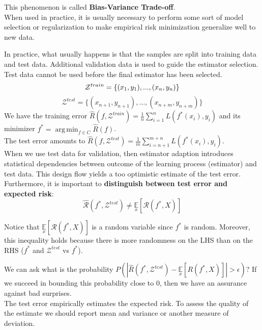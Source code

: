 \documentclass[twoside]{article}
\DeclareMathOperator*{\argmin}{arg\,min}
\begin{document}
This phenomenon is called \textbf{Bias-Variance Trade-off}.\\
When used in practice, it is usually necessary to perform some sort of model selection or regularization to make empirical risk minimization generalize well to new data.\medskip

In practice, what usually happens is that the samples are split into training data and test data. Additional validation data is used to guide the estimator selection.\\
Test data cannot be used before the final estimator has been selected.
\begin{equation*}
    \mathcal{Z}^{train} = \{(x_1, y_1),...,(x_n, y_n)\}\\
\end{equation*}
\begin{equation*}
    \mathcal{Z}^{test} = \{(x_{n+1}, y_{n+1}),...,(x_{n+m}, y_{n+m})\}
\end{equation*}
We have the training error $\hat{R}(f, \mathcal{Z}^{train}) = \frac{1}{n}\sum\limits_{i = 1}^{n}L(f^*(x_i), y_i)$ and its minimizer $f^* = \argmin_{f \in C} \hat{R}(f)$.\\
The test error amounts to $\hat{R}(f, \mathcal{Z}^{test}) = \frac{1}{m}\sum\limits_{i = n+1}^{m+n}L(f^*(x_i), y_i)$.\\
When we use test data for validation, then estimator adaption introduces statistical dependencies between outcome of the learning process (estimator) and test data. This design flow yields a too optimistic estimate of the test error.\\
Furthermore, it is important to \textbf{distinguish between test error and expected risk}:
\begin{equation*}
    \hat{\mathcal{R}}(f^*, \mathcal{Z}^{test}) \neq \underset{x}{\mathbb{E}}[\mathcal{R}(f^*, X)]
\end{equation*}

Notice that $\underset{x}{\mathbb{E}}[\mathcal{R}(f^*, X)]$ is a random variable since $f^*$ is random. Moreover,  this inequality holds because there is more randomness on the LHS than on the RHS ($f^*$ and $\mathcal{Z}^{test}$ vs $f^*$). 

We can ask what is the probability $P(|\hat{R}(f^*, \mathcal{Z}^{test})-\underset{x}{\mathbb{E}}[R(f^*, X)]|> \epsilon)$? If we succeed in bounding this probability close to 0, then we have an assurance against bad surprises. \\
The test error empirically estimates the expected risk. To assess the quality of the estimate we should report mean and variance or another measure of deviation.
\end{document}
